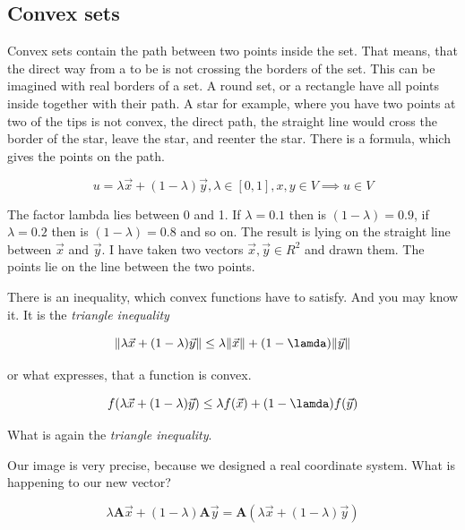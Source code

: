 \documentclass[a4paper]{article}
\begin{document}
\subsection{Convex sets}

Convex sets contain the path between two points inside the set. That means, that the direct way from a to be is not crossing the borders of the set. This can be imagined with real borders of a set. A round set, or a rectangle have all points inside together with their path. A star for example, where you have two points at two of the tips is not convex, the direct path, the straight line would cross the border of the star, leave the star, and reenter the star. There is a formula, which gives the points on the path.

\begin{displaymath}
u = \lambda\vec{x} + (1-\lambda)\vec{y}, \lambda \in [0,1], x,y \in V \implies u \in V
\end{displaymath}

The factor lambda lies between 0 and 1. If $\lambda = 0.1$ then is $(1-\lambda) = 0.9$, if $\lambda = 0.2$ then is $(1-\lambda) = 0.8$ and so on. The result is lying on the straight line between $\vec{x}$ and $\vec{y}$. I have taken two vectors $\vec{x}, \vec{y} \in R^2$ and drawn them. The points lie on the line between the two points.

There is an inequality, which convex functions have to satisfy. And you may know it. It is the \emph{triangle inequality}

\begin{displaymath}
\|\lambda\vec{x} + (1-\lambda)\vec{y}\| \leq \lambda\|\vec{x}\| + (1-\lamda)\|\vec{y}\|
\end{displaymath}


or what expresses, that a function is convex.

\begin{displaymath}
f(\lambda\vec{x} + (1-\lambda)\vec{y}) \leq \lambda f(\vec{x}) + (1-\lamda)f(\vec{y})
\end{displaymath}

What is again the \emph{triangle inequality}.

Our image is very precise, because we designed a real coordinate system. What is happening to our new vector? 

\begin{displaymath}
\lambda\boldsymbol{A}\vec{x} + (1-\lambda)\boldsymbol{A}\vec{y} = \boldsymbol{A}(\lambda\vec{x} + (1-\lambda)\vec{y})
\end{displaymath}
\end{document}

